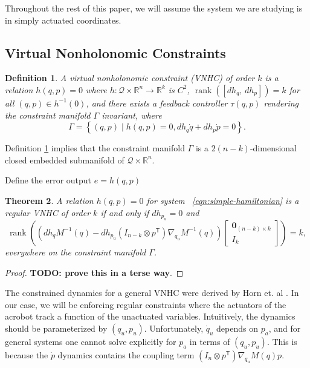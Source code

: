 \documentclass[journal,twoside,web]{ieeecolor}
\newtheorem{thm}{Theorem}%
\newtheorem{defn}[thm]{Definition} %
\DeclareMathOperator{\Rank}{rank}
\newcommand*{\rank}[1]{\Rank\left(#1\right)}
\newcommand*{\tpose}{^\mathsf{T}}
\newcommand*{\inv}{^\mathsf{-1}}
\newcommand*{\R}{\mathbb{R}}
\newcommand*{\Minv}{M^\mathsf{-1}}
\newcommand*{\Id}[1]{I_{#1}}
\newcommand*{\Zmat}[1]{\bm{0}_{#1}}
\newcommand*{\simpleB}{\begin{bmatrix}\Zmat{(n-k)\times k}\\ \Id{k}\end{bmatrix}}
\begin{document}
Throughout the rest of this paper, we will assume the system we are studying is
in simply actuated coordinates.

\subsection{Virtual Nonholonomic Constraints}

\begin{defn}\label{defn:vnhc}
    A \textit{virtual nonholonomic constraint} (VNHC) \textit{of order \(k\)} is a
    relation \(h(q,p) = 0\) where \(h : \mathcal{Q}\times\R^n \rightarrow \R^k\) is
    \(C^2\), \(\rank{\left[ dh_q,\, dh_p \right]} = k\) for all 
    \((q,p) \in h\inv(0)\), and there exists a feedback controller \(\tau(q,p)\)
    rendering the \textit{constraint manifold} \(\Gamma\) invariant,
    where
    \[
        \Gamma = \left\{(q,p) \mid h(q,p) = 0, dh_q \dot{q} + dh_p \dot{p} = 0\right\}
        .
    \]
\end{defn}

Definition \ref{defn:vnhc} implies that the constraint manifold \(\Gamma\)
is a \(2(n-k)\)-dimensional closed embedded submanifold of 
\(\mathcal{Q} \times \R^n\). 


Define the error output \(e = h(q,p)\) 

\begin{thm}\label{thm:vnhc-regularity}
    A relation \(h(q,p) = 0\) for system ~\eqref{eqn:simple-hamiltonian}
    is a regular VNHC of order \(k\) if and only if \(dh_{p_a} = 0\) 
    and
    \[
        \rank{\left(dh_q \Minv(q) - 
          dh_{p_u} (\Id{n-k} \otimes p\tpose)\nabla_{q_u}\Minv(q) 
         \right)\simpleB} = k
         ,
    \]
    everywhere on the constraint manifold \(\Gamma\).
\end{thm}
\begin{proof}
    \textbf{TODO: prove this in a terse way}.
\end{proof}

The constrained dynamics for a general VNHC were derived by 
Horn et. al \cite{nhvc_dynamic_walking}.
In our case, we will be enforcing regular constraints where the actuators of the
acrobot track a function of the unactuated variables. 
Intuitively, the dynamics should be parameterized by \((q_u, p_u)\).
Unfortunately, \(\dot{q}_u\) depends on \(p_a\), and for general systems one
cannot solve explicitly for \(p_a\) in terms of \((q_u,p_u)\). 
This is because the \(\dot{p}\) dynamics contains the coupling term 
\((\Id{n} \otimes p\tpose)\nabla_{q_u}M(q)p\). 
\end{document}
